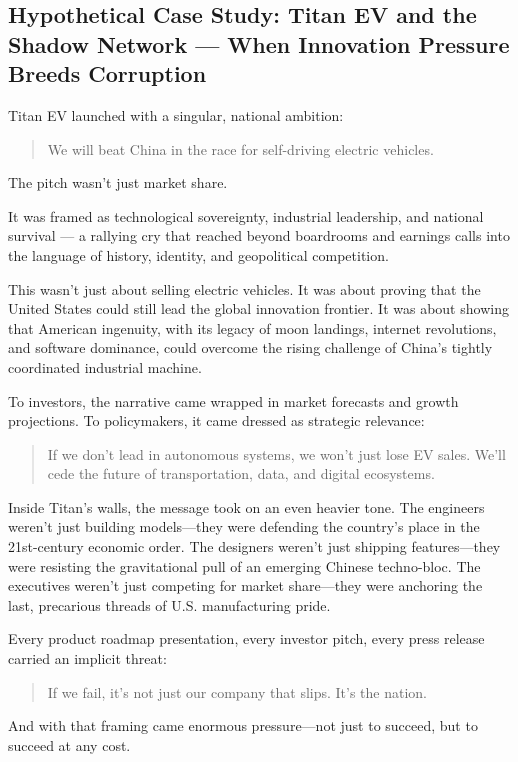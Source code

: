\subsection{Hypothetical Case Study: Titan EV and the Shadow Network — When Innovation Pressure Breeds Corruption}

Titan EV launched with a singular, national ambition:
\begin{quote}
We will beat China in the race for self-driving electric vehicles.
\end{quote}

The pitch wasn’t just market share.

It was framed as technological sovereignty, industrial leadership, and national survival — a rallying cry that reached beyond boardrooms and earnings calls into the language of history, identity, and geopolitical competition.

This wasn’t just about selling electric vehicles.
It was about proving that the United States could still lead the global innovation frontier.
It was about showing that American ingenuity, with its legacy of moon landings, internet revolutions, and software dominance, could overcome the rising challenge of China’s tightly coordinated industrial machine.

To investors, the narrative came wrapped in market forecasts and growth projections.
To policymakers, it came dressed as strategic relevance:
\begin{quote}
If we don’t lead in autonomous systems, we won’t just lose EV sales.
We’ll cede the future of transportation, data, and digital ecosystems.
\end{quote}

Inside Titan’s walls, the message took on an even heavier tone.
The engineers weren’t just building models—they were defending the country’s place in the 21st-century economic order.
The designers weren’t just shipping features—they were resisting the gravitational pull of an emerging Chinese techno-bloc.
The executives weren’t just competing for market share—they were anchoring the last, precarious threads of U.S. manufacturing pride.

Every product roadmap presentation, every investor pitch, every press release carried an implicit threat:

\begin{quote}
If we fail,
it’s not just our company that slips.
It’s the nation.
\end{quote}

And with that framing came enormous pressure—not just to succeed,
but to succeed at any cost.

